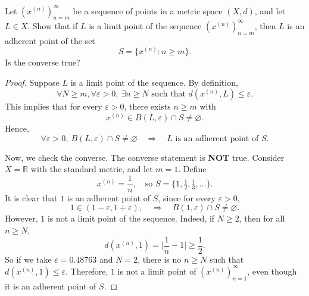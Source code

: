\begin{problem}
    Let $(x^{(n)})_{n=m}^\infty$ be a sequence of points in a metric space $(X,d)$, and let $L\in X$. Show that if $L$ is a limit point of the sequence $(x^{(n)})_{n=m}^\infty$, then $L$ is an adherent point of the set
\[
S = \{ x^{(n)} : n\ge m \}.
\]
Is the converse true?
\end{problem}

\begin{proof}
    Suppose $L$ is a limit point of the sequence. By definition,
    \[
    \forall N \geq m, \forall \varepsilon > 0,\ \exists n \geq N \text{ such that } d(x^{(n)}, L) \leq \varepsilon.
    \]
    This implies that for every $\varepsilon > 0$, there exists $n \geq m$ with
    \[
    x^{(n)} \in B(L,\varepsilon) \cap S \neq \varnothing.
    \]
    Hence,
    \[
    \forall \varepsilon > 0,\ B(L,\varepsilon)\cap S \neq \varnothing 
    \quad \Rightarrow \quad 
    L \text{ is an adherent point of } S.
    \]

    Now, we check the converse. The converse statement is \textbf{NOT} true.  
    Consider $X = \mathbb{R}$ with the standard metric, and let $m=1$. Define
    \[
    x^{(n)} = \frac{1}{n}, \quad \text{so } S = \{1, \tfrac{1}{2}, \tfrac{1}{3}, \dots \}.
    \]
    It is clear that $1$ is an adherent point of $S$, since for every $\varepsilon > 0$,
    \[
    1 \in (1-\varepsilon, 1+\varepsilon), 
    \quad \Rightarrow \quad 
    B(1,\varepsilon)\cap S \neq \varnothing.
    \]
    However, $1$ is not a limit point of the sequence. Indeed, if $N \geq 2$, then for all $n \geq N$,
    \[
    d(x^{(n)},1) = \bigg| \frac{1}{n} - 1 \bigg| \geq \frac{1}{2}.
    \]
    So if we take $\varepsilon = 0.48763$ and $N = 2$, there is no $n \geq N$ such that $d(x^{(n)},1)\leq \varepsilon$.
    Therefore, $1$ is not a limit point of $(x^{(n)})_{n=1}^\infty$, 
    even though it is an adherent point of $S$.
\end{proof}

